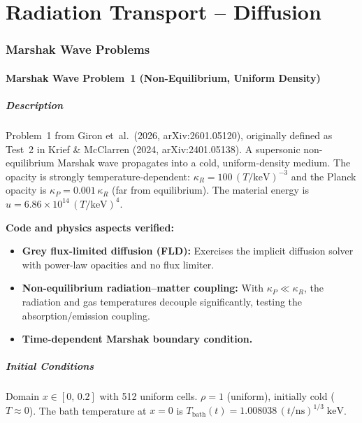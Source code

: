 \documentclass[11pt,a4paper]{article}
\begin{document}
\newpage


\part{Radiation Transport -- Diffusion}
\setcounter{section}{0}
\newpage

\section{Marshak Wave Problems}
\label{sec:marshak_waves}

\subsection{Marshak Wave Problem~1 (Non-Equilibrium, Uniform Density)}
\label{sec:marshak_wave_1_diffusion}

\subsubsection*{Description}
Problem~1 from Giron et~al.\ (2026, arXiv:2601.05120), originally defined as Test~2 in Krief \& McClarren (2024, arXiv:2401.05138). A supersonic non-equilibrium Marshak wave propagates into a cold, uniform-density medium. The opacity is strongly temperature-dependent: $\kappa_R = 100\,(T/\mathrm{keV})^{-3}$ and the Planck opacity is $\kappa_P = 0.001\,\kappa_R$ (far from equilibrium). The material energy is $u = 6.86\times10^{14}\,(T/\mathrm{keV})^4$.

\textbf{Code and physics aspects verified:}
\begin{itemize}
  \item \textbf{Grey flux-limited diffusion (FLD):} Exercises the implicit diffusion solver with power-law opacities and no flux limiter.
  \item \textbf{Non-equilibrium radiation--matter coupling:} With $\kappa_P \ll \kappa_R$, the radiation and gas temperatures decouple significantly, testing the absorption/emission coupling.
  \item \textbf{Time-dependent Marshak boundary condition.}
\end{itemize}

\subsubsection*{Initial Conditions}
Domain $x \in [0,\,0.2]$ with 512 uniform cells. $\rho = 1$ (uniform), initially cold ($T \approx 0$). The bath temperature at $x=0$ is $T_{\mathrm{bath}}(t) = 1.008038\,(t/\mathrm{ns})^{1/3}\;\mathrm{keV}$.
\end{document}
